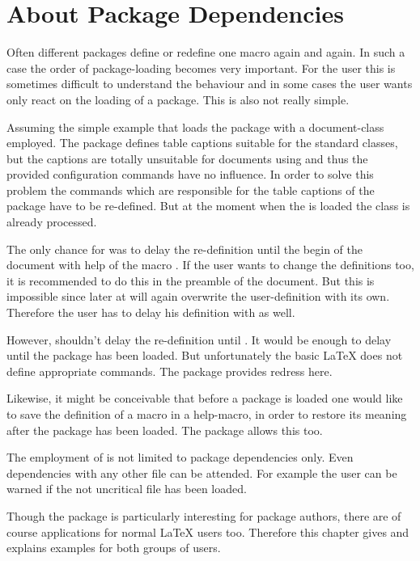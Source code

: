 \section{About Package Dependencies}
\label{sec:scrlfile.dependency}
\begin{Explain}
  Often different packages define or redefine one macro again and again.  In
  such a case the order of package-loading becomes very important.  For the
  user this is sometimes difficult to understand the behaviour and in some
  cases the user wants only react on the loading of a package. This is also
  not really simple.

  Assuming the simple example that loads the package  with
  a \KOMAScript{} document-class employed.  The  package
  defines table captions suitable for the standard classes, but the captions
  are totally unsuitable for documents using \KOMAScript{} and thus the
  provided configuration commands have no influence.  In order to solve this
  problem the commands which are responsible for the table captions of the
   package have to be re-defined. But at the moment when
  the  is loaded the \KOMAScript{} class is already
  processed.

  The only chance for \KOMAScript{} was to delay the re-definition until the
  begin of the document with help of the macro .  If
  the user wants to change the definitions too, it is recommended to do this
  in the preamble of the document.  But this is impossible since later at
   \KOMAScript will again overwrite the
  user-definition with its own.  Therefore the user has to delay his
  definition with  as well.
  
  However, \KOMAScript{} shouldn't delay the re-definition until
  .  It would be enough to delay until the
  package  has been loaded. But unfortunately the basic
  \LaTeX{} does not define appropriate commands. The package
   provides redress here.
  
  Likewise, it might be conceivable that before a package is loaded one would
  like to save the definition of a macro in a help-macro, in order to restore
  its meaning after the package has been loaded. The package
   allows this too.
  
  The employment of  is not limited to package dependencies
  only.  Even dependencies with any other file can be attended.  For example
  the user can be warned if the not uncritical file  has been
  loaded.
  
  Though the package is particularly interesting for package authors, there
  are of course applications for normal \LaTeX{} users too.  Therefore this
  chapter gives and explains examples for both groups of users.
\end{Explain}


